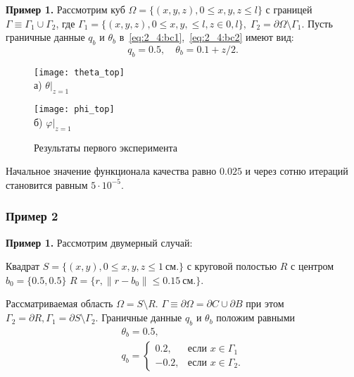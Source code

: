 \begin{frame}
    \textbf{Пример 1.}
    Рассмотрим куб $\Omega = \{ (x, y, z), 0 \leq x,y,z \leq l \}$ с границей
    $\Gamma \equiv \Gamma_1 \cup \Gamma_2$, где
    $
        \Gamma_1 = \{(x, y, z), 0 \leq x,y, \leq l, z \in 0, l\}, \;
        \Gamma_2 = \partial \Omega \setminus \Gamma_1.
    $
    Пусть граничные данные $q_b$ и $\theta_b$ в~\eqref{eq:2_4:bc1},~\eqref{eq:2_4:bc2} имеют вид:
    \[ q_b = 0.5, \quad \theta_b = 0.1 + z/2. \]

    \begin{figure}[h!t]
        \begin{minipage}[b][][b]{0.49\linewidth}
            \centering
            \texttt{[image: theta\_top]}
            \\ а) $\theta|_{z=1}$
        \end{minipage}
        \hfill
        \begin{minipage}[b][][b]{0.49\linewidth}
            \centering
            \texttt{[image: phi\_top]}
            \\ б) $\varphi|_{z=1}$
        \end{minipage}
        \caption{Результаты первого эксперимента}
        \label{fig:4_4:5}
    \end{figure}


    Начальное значение функционала качества равно $0.025$ и
    через сотню итераций становится равным $5\cdot 10^{-5}$.
\end{frame}

\begin{frame}
    \frametitle{Пример 2}
    \textbf{Пример 1.}
    Рассмотрим двумерный случай:

    Квадрат $S = \{(x, y), 0 \leq x,y,z \leq 1~\text{см.}\}$ с
    круговой полостью $R$ с центром $b_0 =\{0.5, 0.5\}$
    $R = \{r, \| r - b_0 \| \leq 0.15~\text{см.} \}$.

    Рассматриваемая область $\Omega = S \setminus R$.
    $\Gamma \equiv \partial \Omega = \partial C \cup \partial B$ при этом
    $ \Gamma_2 = \partial R, \Gamma_1 = \partial S \setminus \Gamma_2$.
    Граничные данные $q_b$ и $\theta_b$ положим равными
    \begin{gather*}
        \theta_b = 0.5, \\
        q_b =
        \begin{cases}
            0.2, & \text{если } x \in \Gamma_1 \\
            -0.2, & \text{если } x \in \Gamma_2.
        \end{cases}
    \end{gather*}


\end{frame}

